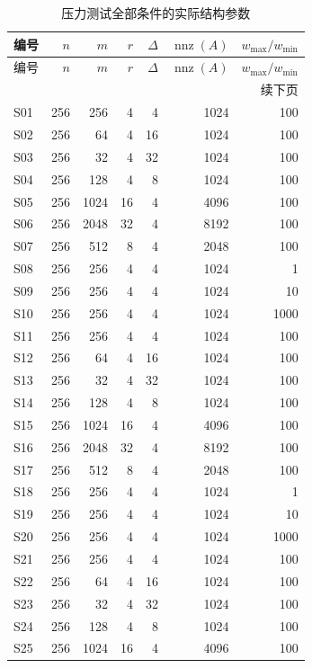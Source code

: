 {\small\setlength{\tabcolsep}{4pt}
\begin{longtable}{lrrrrrr}
\caption{压力测试全部条件的实际结构参数}\label{tab:stress_parameters}\\
\toprule
编号 & $n$ & $m$ & $r$ & $\Delta$ & $\operatorname{nnz}(A)$ & $w_{\max}/w_{\min}$\\
\midrule
\endfirsthead
\toprule
编号 & $n$ & $m$ & $r$ & $\Delta$ & $\operatorname{nnz}(A)$ & $w_{\max}/w_{\min}$\\
\midrule
\endhead
\midrule
\multicolumn{7}{r}{续下页}\\
\endfoot
\bottomrule
\endlastfoot
S01 & 256 & 256 & 4 & 4 & 1024 & 100\\
S02 & 256 & 64 & 4 & 16 & 1024 & 100\\
S03 & 256 & 32 & 4 & 32 & 1024 & 100\\
S04 & 256 & 128 & 4 & 8 & 1024 & 100\\
S05 & 256 & 1024 & 16 & 4 & 4096 & 100\\
S06 & 256 & 2048 & 32 & 4 & 8192 & 100\\
S07 & 256 & 512 & 8 & 4 & 2048 & 100\\
S08 & 256 & 256 & 4 & 4 & 1024 & 1\\
S09 & 256 & 256 & 4 & 4 & 1024 & 10\\
S10 & 256 & 256 & 4 & 4 & 1024 & 1000\\
S11 & 256 & 256 & 4 & 4 & 1024 & 100\\
S12 & 256 & 64 & 4 & 16 & 1024 & 100\\
S13 & 256 & 32 & 4 & 32 & 1024 & 100\\
S14 & 256 & 128 & 4 & 8 & 1024 & 100\\
S15 & 256 & 1024 & 16 & 4 & 4096 & 100\\
S16 & 256 & 2048 & 32 & 4 & 8192 & 100\\
S17 & 256 & 512 & 8 & 4 & 2048 & 100\\
S18 & 256 & 256 & 4 & 4 & 1024 & 1\\
S19 & 256 & 256 & 4 & 4 & 1024 & 10\\
S20 & 256 & 256 & 4 & 4 & 1024 & 1000\\
S21 & 256 & 256 & 4 & 4 & 1024 & 100\\
S22 & 256 & 64 & 4 & 16 & 1024 & 100\\
S23 & 256 & 32 & 4 & 32 & 1024 & 100\\
S24 & 256 & 128 & 4 & 8 & 1024 & 100\\
S25 & 256 & 1024 & 16 & 4 & 4096 & 100\\

\end{longtable}}
